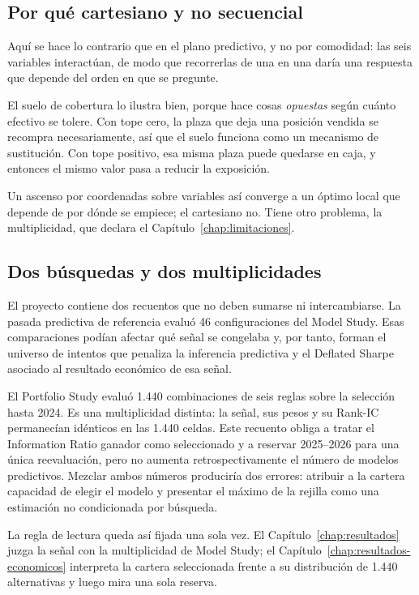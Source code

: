 \subsection{Por qué cartesiano y no secuencial}

Aquí se hace lo contrario que en el plano predictivo, y no por comodidad: las seis variables
interactúan, de modo que recorrerlas de una en una daría una respuesta que depende del
orden en que se pregunte.

El suelo de cobertura lo ilustra bien, porque hace cosas \emph{opuestas} según cuánto efectivo se
tolere. Con tope cero, la plaza que deja una posición vendida se recompra necesariamente, así que el
suelo funciona como un mecanismo de sustitución. Con tope positivo, esa misma plaza puede quedarse
en caja, y entonces el mismo valor pasa a reducir la exposición.

Un ascenso por coordenadas sobre variables así converge a un óptimo local que depende de por dónde
se empiece; el cartesiano no. Tiene otro problema, la multiplicidad, que declara el
Capítulo~\ref{chap:limitaciones}.

\subsection{Dos búsquedas y dos multiplicidades}
\label{sec:dos-multiplicidades}

El proyecto contiene dos recuentos que no deben sumarse ni intercambiarse. La pasada predictiva de
referencia evaluó 46 configuraciones del Model Study. Esas comparaciones podían afectar qué señal
se congelaba y, por tanto, forman el universo de intentos que penaliza la inferencia predictiva y el
Deflated Sharpe asociado al resultado económico de esa señal.

El Portfolio Study evaluó 1.440 combinaciones de seis reglas sobre la selección hasta 2024. Es una
multiplicidad distinta: la señal, sus pesos y su Rank-IC permanecían idénticos en las 1.440 celdas.
Este recuento obliga a tratar el Information Ratio ganador como seleccionado y a reservar
2025--2026 para una única reevaluación, pero no aumenta retrospectivamente el número de modelos
predictivos. Mezclar ambos números produciría dos errores: atribuir a la cartera capacidad de elegir
el modelo y presentar el máximo de la rejilla como una estimación no condicionada por búsqueda.

La regla de lectura queda así fijada una sola vez. El Capítulo~\ref{chap:resultados} juzga la señal
con la multiplicidad de Model Study; el Capítulo~\ref{chap:resultados-economicos} interpreta la
cartera seleccionada frente a su distribución de 1.440 alternativas y luego mira una sola reserva.

